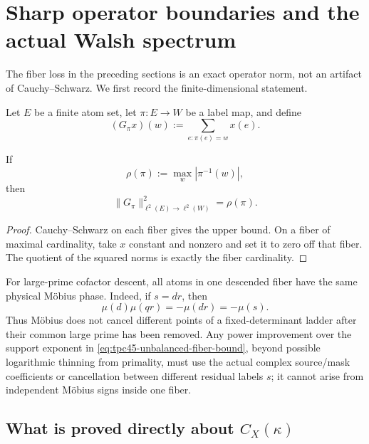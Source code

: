 \section{Sharp operator boundaries and the actual Walsh spectrum}
\label{sec:tpc45-boundaries}

The fiber loss in the preceding sections is an exact operator norm, not
an artifact of Cauchy--Schwarz.  We first record the finite-dimensional
statement.

Let \(E\) be a finite atom set, let \(\pi:E\to W\) be a label map, and
define
\begin{equation}
 (G_\pi x)(w):=\sum_{e:\pi(e)=w}x(e).
 \label{eq:tpc45-grouping-operator}
\end{equation}

\begin{proposition}
\label{prop:tpc45-sharp-grouping-norm}
If
\begin{equation}
 \rho(\pi):=\max_w|\pi^{-1}(w)|,
 \label{eq:tpc45-grouping-multiplicity}
\end{equation}
then
\begin{equation}
 \boxed{
 \|G_\pi\|_{\ell^2(E)\to\ell^2(W)}^2=\rho(\pi).}
 \label{eq:tpc45-exact-grouping-norm}
\end{equation}
\end{proposition}

\begin{proof}
Cauchy--Schwarz on each fiber gives the upper bound.  On a fiber of
maximal cardinality, take \(x\) constant and nonzero and set it to zero
off that fiber.  The quotient of the squared norms is exactly the fiber
cardinality.
\end{proof}

For large-prime cofactor descent, all atoms in one descended fiber have
the same physical M\"obius phase.  Indeed, if \(s=dr\), then
\begin{equation}
 \mu(d)\mu(qr)=-\mu(dr)=-\mu(s).
 \label{eq:tpc45-fiber-physical-coherence}
\end{equation}
Thus M\"obius does not cancel different points of a fixed-determinant
ladder after their common large prime has been removed.  Any power
improvement over the support exponent in
\eqref{eq:tpc45-unbalanced-fiber-bound}, beyond possible logarithmic
thinning from primality, must use the actual complex source/mask
coefficients or cancellation between different residual labels \(s\);
it cannot arise from independent M\"obius signs inside one fiber.

\subsection{What is proved directly about
\texorpdfstring{\(C_X(\kappa)\)}{C-X(kappa)}}

